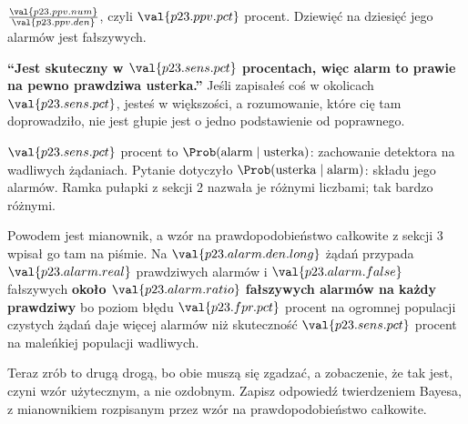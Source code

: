 \begin{fr}
\begin{ansblock}
$\frac{\val{p23.ppv.num}}{\val{p23.ppv.den}}$, czyli $\val{p23.ppv.pct}$
procent. Dziewięć na dziesięć jego alarmów jest fałszywych.
\end{ansblock}

\begin{trapbox}
\textbf{\enquote{Jest skuteczny w $\val{p23.sens.pct}$ procentach, więc alarm
to prawie na pewno prawdziwa usterka.}} Jeśli zapisałeś coś w okolicach
$\val{p23.sens.pct}$, jesteś w większości, a rozumowanie, które cię tam
doprowadziło, nie jest głupie \dash{} jest o jedno podstawienie od poprawnego.

$\val{p23.sens.pct}$ procent to $\Prob(\text{alarm} \mid \text{usterka})$:
zachowanie detektora na wadliwych żądaniach. Pytanie dotyczyło
$\Prob(\text{usterka} \mid \text{alarm})$: składu jego alarmów. Ramka
pułapki z sekcji 2 nazwała je różnymi liczbami; tak bardzo różnymi.

Powodem jest mianownik, a wzór na prawdopodobieństwo całkowite z sekcji 3
wpisał go tam na piśmie. Na $\val{p23.alarm.den.long}$ żądań przypada
$\val{p23.alarm.real}$ prawdziwych alarmów i $\val{p23.alarm.false}$
fałszywych \dash{} \textbf{około $\val{p23.alarm.ratio}$ fałszywych alarmów na
każdy prawdziwy} \dash{} bo poziom błędu $\val{p23.fpr.pct}$ procent na
ogromnej populacji czystych żądań daje więcej alarmów niż skuteczność
$\val{p23.sens.pct}$ procent na maleńkiej populacji wadliwych.
\end{trapbox}

Teraz zrób to drugą drogą, bo obie muszą się zgadzać, a zobaczenie, że tak
jest, czyni wzór użytecznym, a nie ozdobnym. Zapisz odpowiedź twierdzeniem
Bayesa, z mianownikiem rozpisanym przez wzór na prawdopodobieństwo całkowite.
\dotline
\nextframe
\end{fr}

